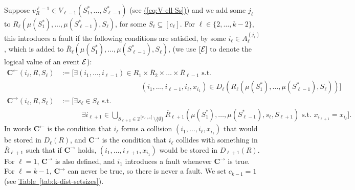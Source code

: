 \documentclass{article}
\newcommand{\eq}[1]{\hyperref[eq:#1]{(\ref*{eq:#1})}}
\newcommand{\tabl}[1]{\hyperref[tab:#1]{Table~\ref*{tab:#1}}}
\renewcommand{\>}{\rangle}
\newcommand{\<}{\langle}
\renewcommand{\(}{\left(}
\renewcommand{\)}{\right)}
\begin{document}
Suppose $v_R^{\ell-1}\in V_{\ell-1}(S_1^*,\dots,S_{\ell-1}^*)$ (see \eq{V-ell-Ss}) and we add some $j_{\ell}$ to $R_{\ell}(\mu(S_1^*),\dots,\mu(S_{\ell-1}^*),S_{\ell})$, for some $S_{\ell}\subseteq [c_{\ell}]$. 
For $\ell\in\{2,\dots,k-2\}$, this introduces a fault if the following conditions are satisfied, by some $i_{\ell}\in A_{\ell}^{(j_{\ell})}$, which is added to $\overline{R}_{\ell}(\mu(S_1^*),\dots,\mu(S_{\ell-1}^*),S_{\ell})$, (we use $[{\cal E}]$ to denote the logical value of an event ${\cal E}$):
\begin{equation}
\begin{split}
\mathbf{C}^{\leftarrow}(i_{\ell},R,S_{\ell})&:= \big[\exists  (i_1,\dots,i_{\ell-1})\in R_1\times \overline{R}_2\times \dots \times \overline{R}_{\ell-1}\mbox{ s.t. }\\
& \qquad\qquad\qquad\qquad\qquad\quad\; (i_1,\dots,i_{\ell-1},i_{\ell},x_{i_1})\in D_{\ell}(R_{\ell}(\mu(S_1^*),\dots,\mu(S_{\ell-1}^*),S_{\ell}))\big]\\
\mathbf{C}^{\rightarrow}(i_{\ell},R,S_{\ell})&:= \Bigg[\exists s_{\ell}\in S_{\ell} \mbox{ s.t. }\\
&\qquad\quad\exists i_{\ell+1}\in \bigcup_{S_{\ell+1}\in 2^{[c_{\ell+1}]}\setminus\{\emptyset\}}\overline{R}_{\ell+1}(\mu(S_1^*),\dots,\mu(S_{\ell-1}^*),s_{\ell},S_{\ell+1}) \mbox{ s.t. }x_{i_{\ell+1}}=x_{i_{\ell}}\Bigg].
\end{split}\label{eq:k-dist-Carrows}
\end{equation}
In words $\mathbf{C}^{\leftarrow}$ is the condition that $i_{\ell}$ forms a collision $(i_1,\dots,i_{\ell},x_{i_1})$ that would be stored in $D_{\ell}(R)$, and $\mathbf{C}^{\rightarrow}$ is the condition that $i_{\ell}$ collides with something in $\overline{R}_{\ell+1}$ such that if $\mathbf{C}^{\rightarrow}$ holds, $(i_1,\dots,i_{\ell+1},x_{i_1})$ would be stored in $D_{\ell+1}(R)$. For $\ell=1$, $\mathbf{C}^{\rightarrow}$ is also defined, and $i_1$ introduces a fault whenever $\mathbf{C}^{\rightarrow}$ is true. For $\ell=k-1$, $\mathbf{C}^{\rightarrow}$ can never be true, so there is never a fault. We set $c_{k-1}=1$ (see \tabl{k-dist-setsizes}).
\end{document}
